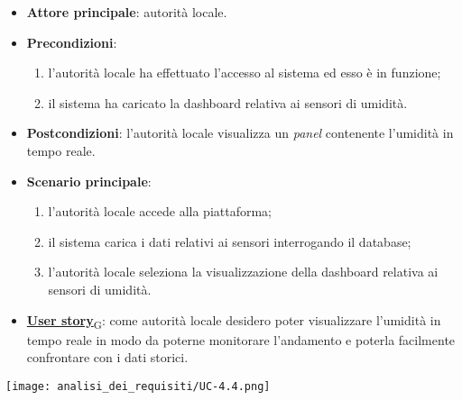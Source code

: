 \begin{itemize}
	\item \textbf{Attore principale}: autorità locale.
	\item \textbf{Precondizioni}:
	      \begin{enumerate}
		      \item l'autorità locale ha effettuato l'accesso al sistema ed esso è in funzione;
		      \item il sistema ha caricato la dashboard relativa ai sensori di umidità.
	      \end{enumerate}
	\item \textbf{Postcondizioni}: l'autorità locale visualizza un \textit{panel} contenente l'umidità in tempo reale.
	\item \textbf{Scenario principale}:
	      \begin{enumerate}
		      \item l'autorità locale accede alla piattaforma;
		      \item il sistema carica i dati relativi ai sensori interrogando il database;
		      \item l'autorità locale seleziona la visualizzazione della dashboard relativa ai sensori di umidità.
	      \end{enumerate}
	\item \href{https://7last.github.io/docs/rtb/documentazione-interna/glossario\#user-story}{\textbf{User story}\textsubscript{G}}:
	      come autorità locale desidero poter visualizzare l'umidità in tempo reale in modo da poterne monitorare l'andamento
	      e poterla facilmente confrontare con i dati storici.
\end{itemize}
\begin{center}
	\texttt{[image: analisi\_dei\_requisiti/UC-4.4.png]}
\end{center}


